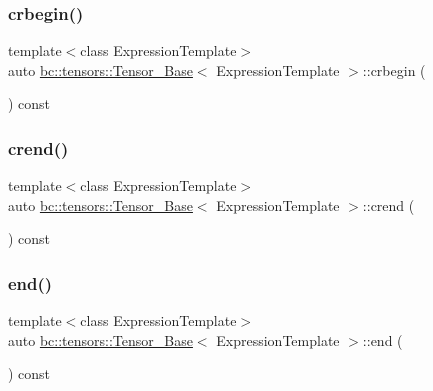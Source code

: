 \subsubsection{\texorpdfstring{crbegin()}{crbegin()}}
{\footnotesize\ttfamily template$<$class Expression\+Template$>$ \\
auto \hyperlink{classbc_1_1tensors_1_1Tensor__Base}{bc\+::tensors\+::\+Tensor\+\_\+\+Base}$<$ Expression\+Template $>$\+::crbegin (\begin{DoxyParamCaption}{ }\end{DoxyParamCaption}) const\hspace{0.3cm}{\ttfamily [inline]}}

\mbox{\label{classbc_1_1tensors_1_1Tensor__Base_aed3b6743b9f37bc524d3819515b2f2f6}} 
\subsubsection{\texorpdfstring{crend()}{crend()}}
{\footnotesize\ttfamily template$<$class Expression\+Template$>$ \\
auto \hyperlink{classbc_1_1tensors_1_1Tensor__Base}{bc\+::tensors\+::\+Tensor\+\_\+\+Base}$<$ Expression\+Template $>$\+::crend (\begin{DoxyParamCaption}{ }\end{DoxyParamCaption}) const\hspace{0.3cm}{\ttfamily [inline]}}

\mbox{\label{classbc_1_1tensors_1_1Tensor__Base_a07e6bf80344d58606a1e7e9cc0c86a09}} 
\subsubsection{\texorpdfstring{end()}{end()}\hspace{0.1cm}{\footnotesize\ttfamily [1/2]}}
{\footnotesize\ttfamily template$<$class Expression\+Template$>$ \\
auto \hyperlink{classbc_1_1tensors_1_1Tensor__Base}{bc\+::tensors\+::\+Tensor\+\_\+\+Base}$<$ Expression\+Template $>$\+::end (\begin{DoxyParamCaption}{ }\end{DoxyParamCaption}) const\hspace{0.3cm}{\ttfamily [inline]}}

